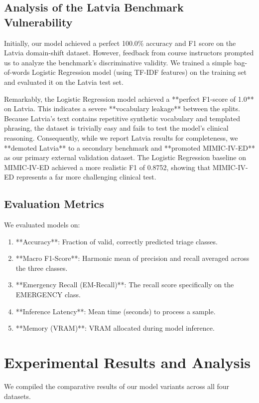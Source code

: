 \documentclass[a4paper, 12pt]{article}
\begin{document}
\subsection{Analysis of the Latvia Benchmark Vulnerability}
Initially, our model achieved a perfect 100.0\% accuracy and F1 score on the Latvia domain-shift dataset. However, feedback from course instructors prompted us to analyze the benchmark's discriminative validity. We trained a simple bag-of-words Logistic Regression model (using TF-IDF features) on the training set and evaluated it on the Latvia test set.

Remarkably, the Logistic Regression model achieved a **perfect F1-score of 1.0** on Latvia. This indicates a severe **vocabulary leakage** between the splits. Because Latvia's text contains repetitive synthetic vocabulary and templated phrasing, the dataset is trivially easy and fails to test the model's clinical reasoning. Consequently, while we report Latvia results for completeness, we **demoted Latvia** to a secondary benchmark and **promoted MIMIC-IV-ED** as our primary external validation dataset. The Logistic Regression baseline on MIMIC-IV-ED achieved a more realistic F1 of 0.8752, showing that MIMIC-IV-ED represents a far more challenging clinical test.

\subsection{Evaluation Metrics}
We evaluated models on:
\begin{enumerate}
    \item **Accuracy**: Fraction of valid, correctly predicted triage classes.
    \item **Macro F1-Score**: Harmonic mean of precision and recall averaged across the three classes.
    \item **Emergency Recall (EM-Recall)**: The recall score specifically on the EMERGENCY class.
    \item **Inference Latency**: Mean time (seconds) to process a sample.
    \item **Memory (VRAM)**: VRAM allocated during model inference.
\end{enumerate}

\section{Experimental Results and Analysis}
\label{sec:results}

We compiled the comparative results of our model variants across all four datasets.
\end{document}
